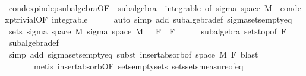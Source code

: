 \begin{isabellebody}
\ \ \ \ \isamarkupfalse%
\ cond{\isacharunderscore}{\kern0pt}exp{\isacharunderscore}{\kern0pt}indep{\isacharunderscore}{\kern0pt}subalgebra{\isacharbrackleft}{\kern0pt}OF\ {\isacharunderscore}{\kern0pt}\ subalgebra\ {\isacharunderscore}{\kern0pt}\ integrable{\isacharcomma}{\kern0pt}\ of\ {\isachardoublequoteopen}sigma\ {\isacharparenleft}{\kern0pt}space\ M{\isacharparenright}{\kern0pt}\ {\isacharbraceleft}{\kern0pt}{\isacharbraceright}{\kern0pt}{\isachardoublequoteclose}{\isacharbrackright}{\kern0pt}\ cond{\isacharunderscore}{\kern0pt}exp{\isacharunderscore}{\kern0pt}trivial{\isacharbrackleft}{\kern0pt}OF\ integrable{\isacharbrackright}{\kern0pt}\isanewline
\ \ \ \ \isamarkupfalse%
\ {\isacharparenleft}{\kern0pt}auto\ simp\ add{\isacharcolon}{\kern0pt}\ subalgebra{\isacharunderscore}{\kern0pt}def\ sigma{\isacharunderscore}{\kern0pt}sets{\isacharunderscore}{\kern0pt}empty{\isacharunderscore}{\kern0pt}eq{\isacharparenright}{\kern0pt}\isanewline
\ \ \isamarkupfalse%
\ {\isachardoublequoteopen}sets\ {\isacharparenleft}{\kern0pt}sigma\ {\isacharparenleft}{\kern0pt}space\ M{\isacharparenright}{\kern0pt}\ {\isacharparenleft}{\kern0pt}sigma\ {\isacharparenleft}{\kern0pt}space\ M{\isacharparenright}{\kern0pt}\ {\isacharbraceleft}{\kern0pt}{\isacharbraceright}{\kern0pt}\ {\isasymunion}\ F{\isacharparenright}{\kern0pt}{\isacharparenright}{\kern0pt}\ {\isacharequal}{\kern0pt}\ F{\isachardoublequoteclose}\isanewline
\ \ \ \ \isamarkupfalse%
\ subalgebra\ sets{\isachardot}{\kern0pt}top{\isacharbrackleft}{\kern0pt}of\ F{\isacharbrackright}{\kern0pt}\ \isamarkupfalse%
\ subalgebra{\isacharunderscore}{\kern0pt}def\ \isanewline
\ \ \ \ \isamarkupfalse%
\ {\isacharparenleft}{\kern0pt}simp\ add{\isacharcolon}{\kern0pt}\ sigma{\isacharunderscore}{\kern0pt}sets{\isacharunderscore}{\kern0pt}empty{\isacharunderscore}{\kern0pt}eq{\isacharcomma}{\kern0pt}\ subst\ insert{\isacharunderscore}{\kern0pt}absorb{\isacharbrackleft}{\kern0pt}of\ {\isachardoublequoteopen}space\ M{\isachardoublequoteclose}\ F{\isacharbrackright}{\kern0pt}{\isacharcomma}{\kern0pt}\ blast{\isacharparenright}{\kern0pt}\ \isanewline
\ \ \ \ \ \ \ {\isacharparenleft}{\kern0pt}metis\ insert{\isacharunderscore}{\kern0pt}absorb{\isacharbrackleft}{\kern0pt}OF\ sets{\isachardot}{\kern0pt}empty{\isacharunderscore}{\kern0pt}sets{\isacharbrackright}{\kern0pt}\ sets{\isachardot}{\kern0pt}sets{\isacharunderscore}{\kern0pt}measure{\isacharunderscore}{\kern0pt}of{\isacharunderscore}{\kern0pt}eq{\isacharparenright}{\kern0pt}\isanewline

\end{isabellebody}
